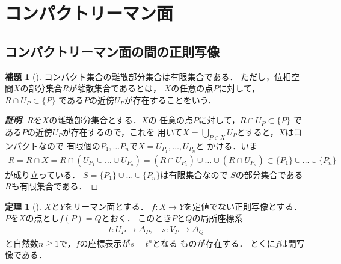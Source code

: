 \documentclass[11pt, a4paper, dvipdfmx, draft]{jsarticle}
\theoremstyle{definition}
\newtheorem{Theorem}[Axiom]{定理}
\newtheorem{Lemma}[Axiom]{補題}
\theoremstyle{mystyle}
\numberwithin{equation}{section} %
\begin{document}
\section{コンパクトリーマン面}

\subsection{コンパクトリーマン面の間の正則写像}

\begin{Lemma}[{\cite[問題2.8]{ogs}}]
    コンパクト集合の離散部分集合は有限集合である．
    ただし，位相空間$X$の部分集合$R$が離散集合であるとは，
    $X$の任意の点$P$に対して，$R\cap U_{P}\subset\{P\}$
    である$P$の近傍$U_P$が存在することをいう．
\end{Lemma}
\begin{proof}[\bf{証明}]
    $R$を$X$の離散部分集合とする．$X$の
    任意の点$P$に対して，$R\cap U_{P}\subset\{P\}$
    である$P$の近傍$U_P$が存在するので，これを
    用いて$X=\bigcup_{P\in X}U_P$とすると，$X$はコンパクトなので
    有限個の$P_1,\dots P_n$で$X=U_{P_{1}},\dots,U_{P_{n}}$と
    かける．いま
    \begin{align*}
        R = R\cap X 
        = R\cap \left(U_{P_{1}}\cup\dots\cup U_{P_{n}}\right)
        = \left(R\cap U_{P_{1}}\right)\cup\dots\cup\left(R\cap U_{P_{n}}\right)
        \subset \{P_1\}\cup\dots\cup\{P_n\}
    \end{align*}
    が成り立っている．
    $S=\{P_1\}\cup\dots\cup\{P_n\}$は有限集合なので
    $S$の部分集合である$R$も有限集合である．
\end{proof}

\begin{Theorem}[{\cite[定理2.18]{ogs}}]
    $X$と$Y$をリーマン面とする．
    $f\colon X\to Y$を定値でない正則写像とする．
    $P$を$X$の点とし$f(P)=Q$とおく．
    このとき$P$と$Q$の局所座標系
    \begin{align*}
        t\colon U_P\to\Delta_P,
        \quad s\colon V_P\to\Delta_Q
    \end{align*}
    と自然数$n\geqq 1$で，$f$の座標表示が$s=t^n$となる
    ものが存在する．
    とくに$f$は開写像である．
\end{Theorem}
\end{document}
